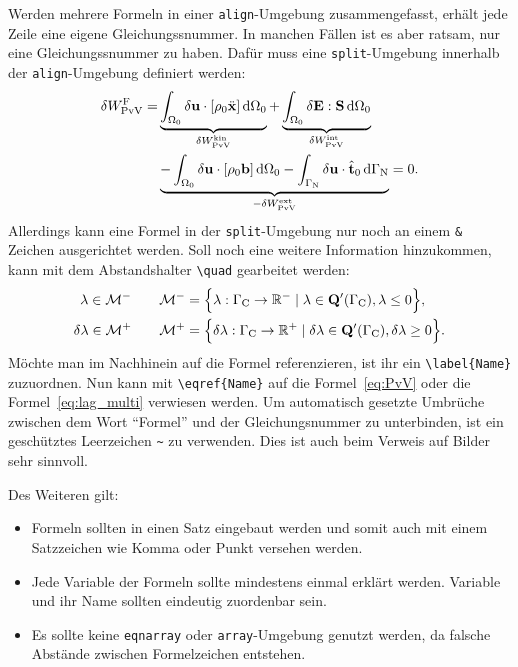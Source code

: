 Werden mehrere Formeln in einer \verb+align+-Umgebung zusammengefasst, erhält
jede Zeile eine eigene Gleichungssnummer. In manchen Fällen ist es aber ratsam,
nur eine Gleichungssnummer zu haben. Dafür muss eine \verb+split+-Umgebung
innerhalb der \verb+align+-Umgebung definiert werden:
%
\begin{align}
\begin{split}
{\delta} W_{\textnormal{PvV}}^{\mathrm{F}} =
&\underbrace{\int_{{\Omega}_0} {\delta}{\mathbf u} \cdot [ \rho_0 \ddot{{\mathbf x}} ] \,{\mathrm{d}}{\Omega}_0
}_{{\delta} W_\textnormal{PvV}^{\textnormal{kin}}} +
\underbrace{\int_{{\Omega}_0} {\delta}{\mathbf E} : {\mathbf S} \,{\mathrm{d}}{\Omega}_0}_{{\delta} W_\textnormal{PvV}^{
{\mathrm{int}}}}  \\
&\underbrace{- \int_{{\Omega}_0} {\delta}{\mathbf u} \cdot [\rho_0 {\mathbf b}] \,{\mathrm{d}}{\Omega}_0
-\int_{{\Gamma}_{\mathrm{N}}} {\delta}{\mathbf u} \cdot \hat{{\mathbf t}}_0
{\,\mathrm{d}}{\Gamma}_{\mathrm{N}}}_{-{\delta} W_\textnormal{PvV}^{{\mathrm{ext}}}}
= 0 .
\end{split}
\label{eq:PvV}
\end{align}
%
Allerdings kann eine Formel in der \verb+split+-Umgebung nur noch an einem
\verb+&+ Zeichen ausgerichtet werden. Soll noch eine weitere Information
hinzukommen, kann mit dem Abstandshalter \verb+\quad+ gearbeitet werden:
\begin{align}
\begin{split}
{\lambda} \in {\mathcal M}^{-} \quad \quad {\mathcal M}^{-} &= \Bigl\{ {\lambda} : {\Gamma}_{\mathrm{C}} \to
{\mathbb R}^{-} \mid {\lambda} \in {\mathbf Q}' ({\Gamma}_{\mathrm{C}}), {\lambda} \leq 0 \Bigr\} , \\
{\delta}{\lambda} \in {\mathcal M}^{+} \quad \quad {\mathcal M}^{+} &= \Bigl\{ {\delta}{\lambda} : {\Gamma}_{\mathrm{C}} \to
{\mathbb R}^{+} \mid {\delta}{\lambda} \in {\mathbf Q}'({\Gamma}_{\mathrm{C}}), {\delta}{\lambda} \geq 0 \Bigr\} .
\end{split}
\label{eq:lag_multi}
\end{align}
Möchte man im Nachhinein auf die Formel
referenzieren, ist ihr ein \verb+\label{Name}+ zuzuordnen. Nun kann mit \verb+\eqref{Name}+ auf die
Formel~\eqref{eq:PvV} oder die Formel~\eqref{eq:lag_multi} verwiesen werden. Um
automatisch gesetzte Umbrüche zwischen dem Wort "`Formel"' und der
Gleichungsnummer zu unterbinden, ist ein geschütztes Leerzeichen \verb+~+ zu
verwenden. Dies ist auch beim Verweis auf Bilder sehr sinnvoll.

Des Weiteren gilt:
\begin{itemize}
  \item Formeln sollten in einen Satz eingebaut werden und somit auch mit einem
  Satzzeichen wie Komma oder Punkt versehen werden.
  \item Jede Variable der Formeln sollte mindestens einmal erklärt werden.
  Variable und ihr Name sollten eindeutig zuordenbar sein.
  \item Es sollte keine \verb+eqnarray+ oder \verb+array+-Umgebung
  genutzt werden, da falsche Abstände zwischen Formelzeichen entstehen.
\end{itemize}

